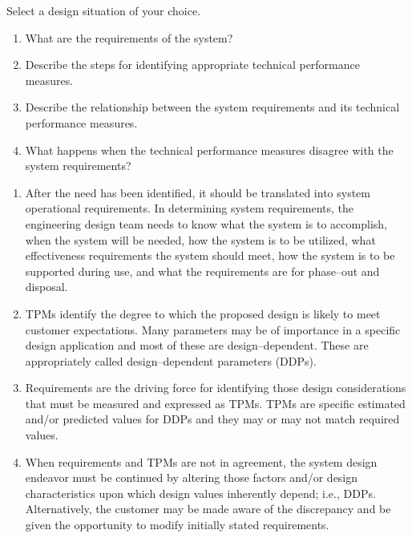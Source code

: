 \begin{exercises}
    \begin{exercise}
    \label{sea-02-15_16}
        Select a design situation of your choice.
        \begin{enumerate}[label=\alph*)]
            \item What are the requirements of the system?
            \item Describe the steps for identifying appropriate technical performance measures.
            \item Describe the relationship between the system requirements and its technical performance measures.
            \item What happens when the technical performance measures disagree with the system requirements?
        \end{enumerate}
    \end{exercise}
    \begin{solution}
        \begin{enumerate}[label=\alph*)]
            \item After the need has been identified, it should be translated into system operational requirements. In determining system requirements, the engineering design team needs to know what the system is to accomplish, when the system will be needed, how the system is to be utilized, what effectiveness requirements the system should meet, how the system is to be supported during use, and what the requirements are for phase–out and disposal.
            \item TPMs identify the degree to which the proposed design is likely to meet customer expectations. Many parameters may be of importance in a specific design application and most of these are design–dependent. These are appropriately called design–dependent parameters (DDPs). 
            \item Requirements are the driving force for identifying those design considerations that must be measured and expressed as TPMs. TPMs are specific estimated and/or predicted values for DDPs and they may or may not match required values. 
            \item When requirements and TPMs are not in agreement, the system design endeavor must be continued by altering those factors and/or design characteristics upon which design values inherently depend; i.e., DDPs. Alternatively, the customer may be made aware of the discrepancy and be given the opportunity to modify initially stated requirements.
        \end{enumerate}
    \end{solution}
    

\end{exercises}
